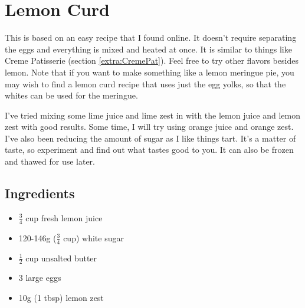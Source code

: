 \documentclass[10pt, openany]{book}
\begin{document}
\section{Lemon Curd}
This is based on an easy recipe that I found online.  It doesn't require separating the eggs and everything is mixed and heated at once.  It is similar to things like Creme Patisserie (section \ref{extra:CremePat}).  Feel free to try other flavors besides lemon.  Note that if you want to make something like a lemon meringue pie, you may wish to find a lemon curd recipe that uses just the egg yolks, so that the whites can be used for the meringue.

I've tried mixing some lime juice and lime zest in with the lemon juice and lemon zest with good results.  Some time, I will try using orange juice and orange zest. I've also been reducing the amount of sugar as I like things tart.  It's a matter of taste, so experiment and find out what tastes good to you.  It can also be frozen and thawed for use later.

\subsection{Ingredients}
\begin{itemize}
  \item $\frac{3}{4}$ cup fresh lemon juice
  \item 120-146g ($\frac{3}{4}$ cup) white sugar
  \item $\frac{1}{2}$ cup unsalted butter
  \item 3 large eggs
  \item 10g (1 tbsp) lemon zest
\end{itemize}
\end{document}
